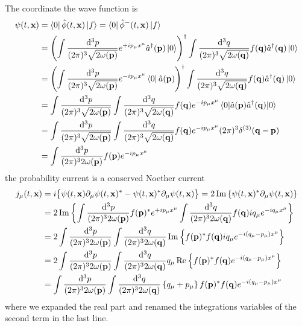 The coordinate the wave function is
\begin{equation}
	\begin{split}
		\psi(t,\vb{x})
		&=
		\bra{0}
		\hat\phi(t,\vb{x})
		\ket{f}
		=
		\bra{0}
		\hat\phi^-(t,\vb{x})
		\ket{f}
		\\
		&=
		\left(
			\int\frac{\dd[3]{p}}{(2\pi)^3\sqrt{2\omega(\vb{p})}}
			e^{+ip_\mu x^\mu}
			\hat{a}^\dagger(\vb{p})
			\ket{0}
		\right)^\dagger
		\int\frac{\dd[3]{q}}{(2\pi)^3\sqrt{2\omega(\vb{q})}}
		f(\vb{q})
		\hat{a}^\dagger(\vb{q})
		\ket{0}
		\\
		&=
		\left(
			\int\frac{\dd[3]{p}}{(2\pi)^3\sqrt{2\omega(\vb{p})}}
			e^{-ip_\mu x^\mu}
			\bra{0}
			\hat{a}(\vb{p})
		\right)^\dagger
		\int\frac{\dd[3]{q}}{(2\pi)^3\sqrt{2\omega(\vb{q})}}
		f(\vb{q})
		\hat{a}^\dagger(\vb{q})
		\ket{0}
		\\
		&=
		\int\frac{\dd[3]{p}}{(2\pi)^3\sqrt{2\omega(\vb{p})}}
		\int\frac{\dd[3]{q}}{(2\pi)^3\sqrt{2\omega(\vb{q})}}
		f(\vb{q})
		e^{-ip_\mu x^\mu}
		\expval{\hat{a}(\vb{p})\hat{a}^\dagger(\vb{q})}{0}
		\\
		&=
		\int\frac{\dd[3]{p}}{(2\pi)^3\sqrt{2\omega(\vb{p})}}
		\int\frac{\dd[3]{q}}{(2\pi)^3\sqrt{2\omega(\vb{q})}}
		f(\vb{q})
		e^{-ip_\mu x^\mu}
		(2\pi)^3
		\delta^{(3)}(\vb{q}-\vb{p})
		\\
		&=
		\int\frac{\dd[3]{p}}{(2\pi)^32\omega(\vb{p})}
		f(\vb{p})
		e^{-ip_\mu x^\mu}
	\end{split}
\end{equation}
the probability current is a conserved Noether current~\cite[p.~18]{Peskin1995}
\begin{equation}
	\begin{split}
		j_\mu(t,\vb{x})
		&=
		i
		\bigl\{
			\psi(t,\vb{x})
			\partial_\mu
			\psi(t,\vb{x})^*
			-
			\psi(t,\vb{x})^*
			\partial_\mu
			\psi(t,\vb{x})
		\bigr\}
		=
		2
		\operatorname{\operatorname{Im}}\left\{
			\psi(t,\vb{x})^*
			\partial_\mu
			\psi(t,\vb{x})
		\right\}
		\\
		&=
		2
		\operatorname{\operatorname{Im}}\left\{
			\int\frac{\dd[3]{p}}{(2\pi)^32\omega(\vb{p})}
			f(\vb{p})^*e^{+ip_\mu x^\mu}
			\int\frac{\dd[3]{q}}{(2\pi)^32\omega(\vb{q})}
			f(\vb{q})iq_\mu e^{-iq_\mu x^\mu}
		\right\}
		\\
		&=
		2
		\int\frac{\dd[3]{p}}{(2\pi)^32\omega(\vb{p})}
		\int\frac{\dd[3]{q}}{(2\pi)^32\omega(\vb{q})}
		\operatorname{\operatorname{Im}}\left\{
			f(\vb{p})^*
			f(\vb{q})
			iq_\mu
			e^{-i(q_\mu-p_\mu)x^\mu}
		\right\}
		\\
		&=
		2
		\int\frac{\dd[3]{p}}{(2\pi)^32\omega(\vb{p})}
		\int\frac{\dd[3]{q}}{(2\pi)^32\omega(\vb{q})}
		q_\mu
		\operatorname{\operatorname{Re}}\left\{
			f(\vb{p})^*
			f(\vb{q})
			e^{-i(q_\mu-p_\mu)x^\mu}
		\right\}
		\\
		&=
		\int\frac{\dd[3]{p}}{(2\pi)^32\omega(\vb{p})}
		\int\frac{\dd[3]{q}}{(2\pi)^32\omega(\vb{q})}
		\left\{
			q_\mu
			+
			p_\mu
		\right\}
		f(\vb{p})^*
		f(\vb{q})
		e^{-i(q_\mu-p_\mu)x^\mu}
	\end{split}
\end{equation}
where we expanded the real part and renamed the integrations variables of the second term in the last line.

